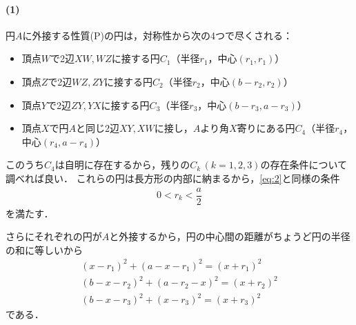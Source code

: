 \documentclass[../../main.tex]{subfiles}
\begin{document}
\paragraph{(1)}

円$A$に外接する性質(P)の円は，対称性から次の4つで尽くされる：
\begin{itemize}
  \item 頂点$W$で2辺$XW,WZ$に接する円$C_1$（半径$r_1$，中心$(r_1,r_1)$）
  \item 頂点$Z$で2辺$WZ,ZY$に接する円$C_2$（半径$r_2$，中心$(b-r_2,r_2)$）
  \item 頂点$Y$で2辺$ZY,YX$に接する円$C_3$（半径$r_3$，中心$(b-r_3,a-r_3)$）
  \item 頂点$X$で円$A$と同じ2辺$XY,XW$に接し，$A$より角$X$寄りにある円$C_4$（半径$r_4$，中心$(r_4,a-r_4)$）
\end{itemize}

このうち$C_4$は自明に存在するから，残りの$C_k\, (k=1,2,3)$の存在条件について調べれば良い．
これらの円は長方形の内部に納まるから，\cref{eq:2}と同様の条件
\begin{align}
  0 < r_k < \dfrac{a}{2} \label{eq:3}
\end{align}
を満たす．

さらにそれぞれの円が$A$と外接するから，円の中心間の距離がちょうど円の半径の和に等しいから
\begin{align}
  (x-r_1)^2+(a-x-r_1)^2=(x+r_1)^2 \label{eq:4}\\
  (b-x-r_2)^2+(a-r_2-x)^2=(x+r_2)^2 \label{eq:5}\\
  (b-x-r_3)^2+(x-r_3)^2=(x+r_3)^2 \label{eq:6}
\end{align}
である．
\end{document}

